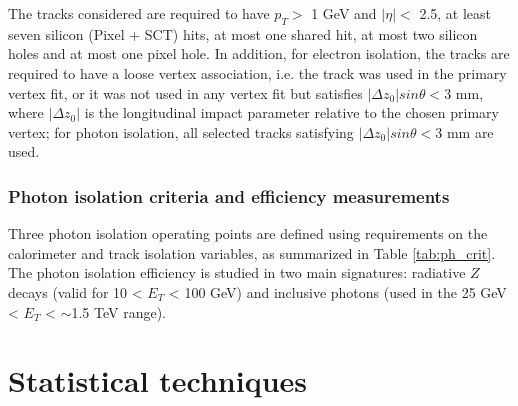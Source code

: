 \documentclass[a4paper, oneside, 11pt, openright]{book}
\begin{document}
\begin{itemize}
				The tracks considered are required to have $p_T >$ 1 GeV and $|\eta| <$ 2.5, at least seven silicon (Pixel + SCT) hits, at most one shared hit, at most two silicon holes and at most one pixel hole. In addition, for electron isolation, the tracks are required to have a loose vertex association, i.e. the track was used in the primary vertex fit, or it was not used in any vertex fit but satisfies $|\Delta z_0|sin{\theta} < 3$ mm, where $|\Delta z_0|$ is the longitudinal impact parameter relative to the chosen primary vertex; for photon
				isolation, all selected tracks satisfying $|\Delta z_0|sin{\theta} < 3$ mm are used.
			\end{itemize}
			
			\subsection{Photon isolation criteria and efficiency measurements}
			Three photon isolation operating points are defined using requirements on the calorimeter and track isolation variables, as summarized in Table \ref{tab:ph_crit}. The photon isolation efficiency is studied in two main signatures: radiative $Z$ decays (valid for 10 < $E_T$ < 100 GeV) and inclusive photons (used in the 25 GeV < $E_T$ < $\sim$1.5 TeV range).
			
			\begin{center}
				\small
				\begin{table}[htbp]
					\caption{Definition of the photon isolation working points.}
					\label{tab:ph_crit} 
				\end{table}
			\end{center}

	\chapter{Statistical techniques}
			
	\newpage
	
	
	
\end{document}
